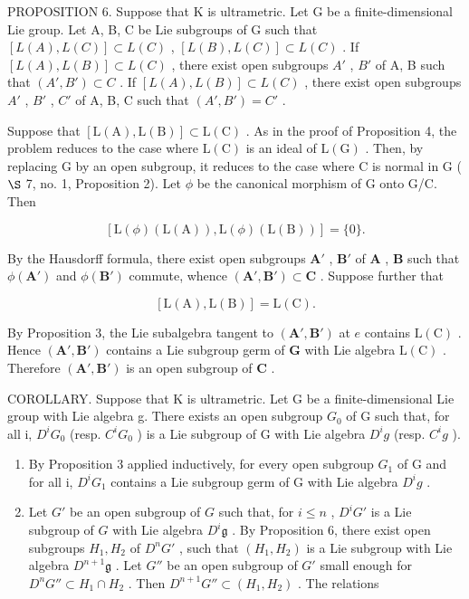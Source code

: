 PROPOSITION 6. Suppose that K is ultrametric. Let G be a finite-dimensional Lie group. Let A, B, C be Lie subgroups of G such that \([L(A), L(C)] \subset L(C)\) , \([L(B), L(C)] \subset L(C)\) . If \([L(A), L(B)] \subset L(C)\) , there exist open subgroups \(A'\) , \(B'\) of A, B such that \((A', B') \subset C\) . If \([L(A), L(B)] \subset L(C)\) , there exist open subgroups \(A'\) , \(B'\) , \(C'\) of A, B, C such that \((A', B') = C'\) .

Suppose that \([\mathrm{L}(\mathrm{A}),\mathrm{L}(\mathrm{B})]\subset\mathrm{L}(\mathrm{C})\) . As in the proof of Proposition 4, the problem reduces to the case where \(\mathrm{L}(\mathrm{C})\) is an ideal of \(\mathrm{L}(\mathrm{G})\) . Then, by replacing G by an open subgroup, it reduces to the case where C is normal in G ( \(\S\) 7, no. 1, Proposition 2). Let \(\phi\) be the canonical morphism of G onto G/C. Then

\[
[ \mathrm{L} (\phi) (\mathrm{L} (\mathrm{A})), \mathrm{L} (\phi) (\mathrm{L} (\mathrm{B})) ] = \{0 \}.
\]

By the Hausdorff formula, there exist open subgroups \(\mathbf{A}'\) , \(\mathbf{B}'\) of \(\mathbf{A}\) , \(\mathbf{B}\) such that \(\phi(\mathbf{A}')\) and \(\phi(\mathbf{B}')\) commute, whence \((\mathbf{A}', \mathbf{B}') \subset \mathbf{C}\) . Suppose further that

\[
[ \mathrm{L} (\mathrm{A}), \mathrm{L} (\mathrm{B}) ] = \mathrm{L} (\mathrm{C}).
\]

By Proposition 3, the Lie subalgebra tangent to \((\mathbf{A}',\mathbf{B}')\) at \(e\) contains \(\mathrm{L}(\mathrm{C})\) . Hence \((\mathbf{A}',\mathbf{B}')\) contains a Lie subgroup germ of \(\mathbf{G}\) with Lie algebra \(\mathrm{L}(\mathrm{C})\) . Therefore \((\mathbf{A}',\mathbf{B}')\) is an open subgroup of \(\mathbf{C}\) .

COROLLARY. Suppose that K is ultrametric. Let G be a finite-dimensional Lie group with Lie algebra g. There exists an open subgroup \(G_{0}\) of G such that, for all i, \(D^{i}G_{0}\) (resp. \(C^{i}G_{0}\) ) is a Lie subgroup of G with Lie algebra \(D^{i}g\) (resp. \(C^{i}g\) ).

\begin{enumerate}
\def\labelenumi{(\alph{enumi})}
\item
  By Proposition 3 applied inductively, for every open subgroup \(G_{1}\) of G and for all i, \(D^{i}G_{1}\) contains a Lie subgroup germ of G with Lie algebra \(D^{i}g\) .
\item
  Let \(G'\) be an open subgroup of \(G\) such that, for \(i \leqslant n\) , \(D^i G'\) is a Lie subgroup of \(G\) with Lie algebra \(D^i\mathfrak{g}\) . By Proposition 6, there exist open subgroups \(H_1, H_2\) of \(D^n G'\) , such that \((H_1, H_2)\) is a Lie subgroup with Lie algebra \(D^{n+1}\mathfrak{g}\) . Let \(G''\) be an open subgroup of \(G'\) small enough for \(D^n G'' \subset H_1 \cap H_2\) . Then \(D^{n+1}G'' \subset (H_1, H_2)\) . The relations
\end{enumerate}

